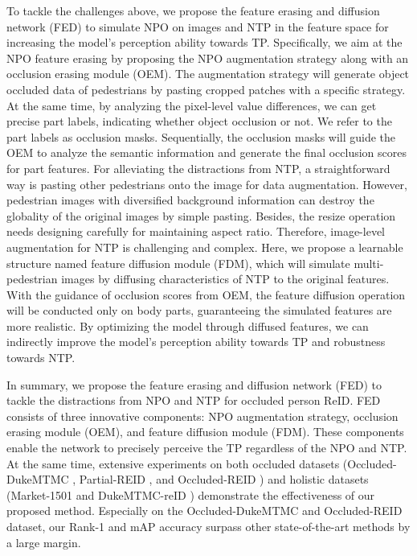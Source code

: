 \documentclass[10pt,twocolumn,letterpaper]{article}
\begin{document}
To tackle the challenges above, we propose the feature erasing and diffusion network (FED) to simulate NPO on images and NTP in the feature space for increasing the model's perception ability towards TP. Specifically, we aim at the NPO feature erasing by proposing the NPO augmentation strategy along with an occlusion erasing module (OEM). 
The augmentation strategy will generate object occluded data of pedestrians by pasting cropped patches with a specific strategy. At the same time, by analyzing the pixel-level value differences, we can get precise part labels, indicating whether object occlusion or not. We refer to the part labels as occlusion masks. Sequentially, the occlusion masks will guide the OEM to analyze the semantic information and generate the final occlusion scores for part features. For alleviating the distractions from NTP, a straightforward way is pasting other pedestrians onto the image for data augmentation. However, pedestrian images with diversified background information can destroy the globality of the original images by simple pasting. Besides, the resize operation needs designing carefully for maintaining aspect ratio. Therefore, image-level augmentation for NTP is challenging and complex. Here, we propose a learnable structure named feature diffusion module (FDM), which will simulate multi-pedestrian images by diffusing characteristics of NTP to the original features. With the guidance of occlusion scores from OEM, the feature diffusion operation will be conducted only on body parts,  guaranteeing the simulated features are more realistic. By optimizing the model through diffused features, we can indirectly improve the model's perception ability towards TP and robustness towards NTP. 


In summary, we propose the feature erasing and diffusion network (FED) to tackle the distractions from NPO and NTP for occluded person ReID. FED consists of three innovative components: NPO augmentation strategy, occlusion erasing module (OEM), and feature diffusion module (FDM). These components enable the network to precisely perceive the TP regardless of the NPO and NTP. At the same time, extensive experiments on both occluded datasets (Occluded-DukeMTMC \cite{miao2019pose}, Partial-REID \cite{yang2019attention}, and Occluded-REID \cite{zhuo2018occluded}) and holistic datasets (Market-1501 \cite{zheng2015scalable} and DukeMTMC-reID \cite{zheng2017unlabeled}) demonstrate the effectiveness of our proposed method. Especially on the Occluded-DukeMTMC and Occluded-REID dataset, our Rank-1 and mAP accuracy surpass other state-of-the-art methods by a large margin.
\end{document}
